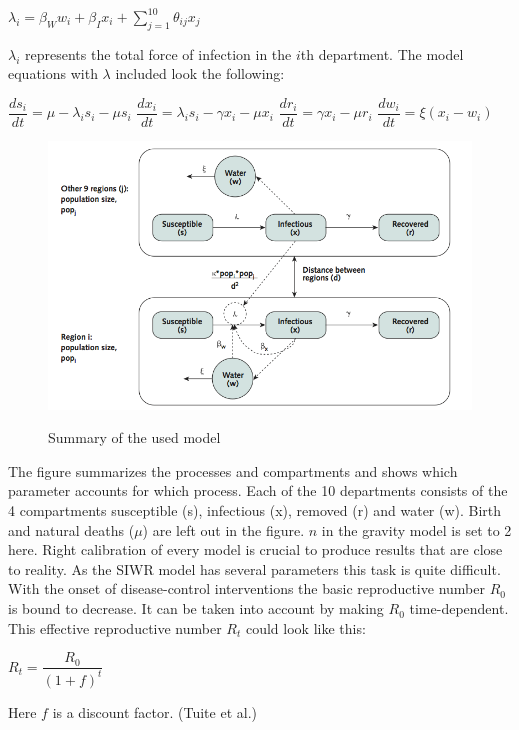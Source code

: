 \documentclass[11pt]{article}
\begin{document}
\begin{center}
$ \lambda_{i}=\beta_{W}w_{i}+\beta_{I}x_{i}+\sum_{j=1}^{10}\theta_{ij}x_{j}
$
\end{center}
$ \lambda_{i} $ represents the total force of infection in the $ i $th department. The model equations with $ \lambda $ included look the following:
\begin{center}
$ \dfrac{ds_{i}}{dt}=\mu -\lambda_{i}s_{i}-\mu s_{i} $
\linebreak
$ \dfrac{dx_{i}}{dt}=\lambda_{i}s_{i}-\gamma x_{i}-\mu x_{i} $
\linebreak
$ \dfrac{dr_{i}}{dt}=\gamma x_{i}-\mu r_{i} $
\linebreak
$ \dfrac{dw_{i}}{dt}=\xi (x_{i}-w_{i}) $
\end{center}
\begin{figure}
\includegraphics[scale=1]{Bilder/figure_model.png} \\
\caption{Summary of the used model}
\end{figure}
 The figure summarizes the processes and compartments and shows which parameter accounts for which process. Each of the 10 departments consists of the 4 compartments susceptible (s), infectious (x), removed (r) and water (w). Birth and natural deaths ($ \mu $) are left out in the figure. $ n $ in the gravity model is set to 2 here.
\linebreak
Right calibration of every model is crucial to produce results that are close to reality. As the SIWR model has several parameters this task is quite difficult. With the onset of disease-control interventions the basic reproductive number $ R_{0} $ is bound to decrease. It can be taken into account by making $ R_{0} $ time-dependent. This effective reproductive number $ R_{t} $ could look like this:
\begin{center}


$ R_{t}=\dfrac{R_{0}}{(1+f)^{t}} $
\end{center}
Here $ f $ is a discount factor.
(Tuite et al.)
\end{document}
